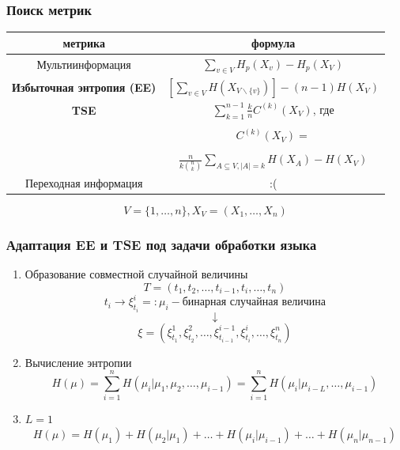 \documentclass{beamer}
\begin{document}
\begin{frame}
	\frametitle{Поиск метрик}
	\let\thefootnote\relax{}
		
	\begin{table}
		\begin{tabular}{c|c}
			\hline
			метрика & формула \\
			\hline
			Мультиинформация & $\sum\limits_{v\in V}H_p(X_v) - H_p(X_V)$ \\
			\hline
			{\bf Избыточная энтропия (EE)} & $\left[\sum\limits_{v\in V}H(X_{V\backslash\{v\}})\right] - (n - 1)H(X_V)$ \\
			\hline
			{\bf TSE} & $\sum\limits_{k=1}^{n-1}\frac{k}{n}C^{(k)}(X_V)$, где \\\\
			& $C^{(k)}(X_V) =$ \\\\
			& $\frac{n}{k\binom{n}{k}}\sum\limits_{A\subseteq V,|A|=k}H(X_A) - H(X_V)$ \\
			\hline
			Переходная информация & :( \\
			\hline
		\end{tabular}
	\end{table}

	\[
		V=\{1,\ldots,n\},
		X_V = (X_1,\ldots,X_n)
	\]
\end{frame}

\begin{frame}
	\frametitle{Адаптация EE и TSE под задачи обработки языка}
	
	\begin{enumerate}
		\item Образование совместной случайной величины
		\[
			T=(t_1, t_2, \ldots, t_{i-1},t_i,\ldots, t_n)
		\]
		\[
			t_i\rightarrow \xi^i_{t_i} =: \mu_i - \text{бинарная случайная величина}
		\]
		\[
			\downarrow
		\]
		\[
			\xi=(\xi^1_{t_1},\xi^2_{t_2},\ldots,\xi^{i-1}_{t_{i-1}},\xi^i_{t_i},\ldots,\xi^n_{t_n})
		\]
		\item Вычисление энтропии
		\[
			H(\mu) = \sum\limits_{i=1}^{n}H(\mu_i|\mu_1,\mu_2,\ldots,\mu_{i-1}) = \sum\limits_{i=1}^{n}H(\mu_i|\mu_{i-L},\ldots,\mu_{i-1})
		\]
		\item $L=1$
		\[
		H(\mu) = H(\mu_1) + H(\mu_2|\mu_1) + \ldots + H(\mu_i|\mu_{i-1}) + \ldots + H(\mu_n|\mu_{n-1})
		\]
	\end{enumerate}
\end{frame}
\end{document}
